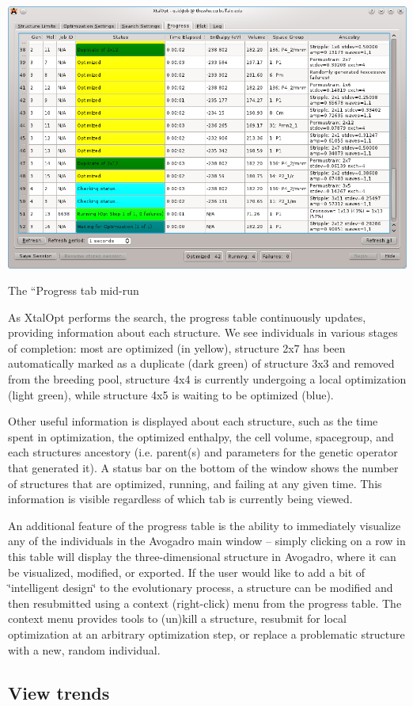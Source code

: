 \begin{DoxyImage}
\includegraphics[width=\textwidth]{prog-mon.png}
\caption{The ``\+Progress\textquotesingle{}\textquotesingle{} tab mid-\/run}
\end{DoxyImage}


As Xtal\+Opt performs the search, the progress table continuously updates, providing information about each structure. We see individuals in various stages of completion\+: most are optimized (in yellow), structure 2x7 has been automatically marked as a duplicate (dark green) of structure 3x3 and removed from the breeding pool, structure 4x4 is currently undergoing a local optimization (light green), while structure 4x5 is waiting to be optimized (blue).

Other useful information is displayed about each structure, such as the time spent in optimization, the optimized enthalpy, the cell volume, spacegroup, and each structure\textquotesingle{}s ancestory (i.\+e. parent(s) and parameters for the genetic operator that generated it). A status bar on the bottom of the window shows the number of structures that are optimized, running, and failing at any given time. This information is visible regardless of which tab is currently being viewed.

An additional feature of the progress table is the ability to immediately visualize any of the individuals in the Avogadro main window -- simply clicking on a row in this table will display the three-\/dimensional structure in Avogadro, where it can be visualized, modified, or exported. If the user would like to add a bit of \char`\"{}intelligent design\char`\"{} to the evolutionary process, a structure can be modified and then resubmitted using a context (right-\/click) menu from the progress table. The context menu provides tools to (un)kill a structure, resubmit for local optimization at an arbitrary optimization step, or replace a problematic structure with a new, random individual.\hypertarget{tut-xo_trends}{}\subsection{View trends}\label{tut-xo_trends}

